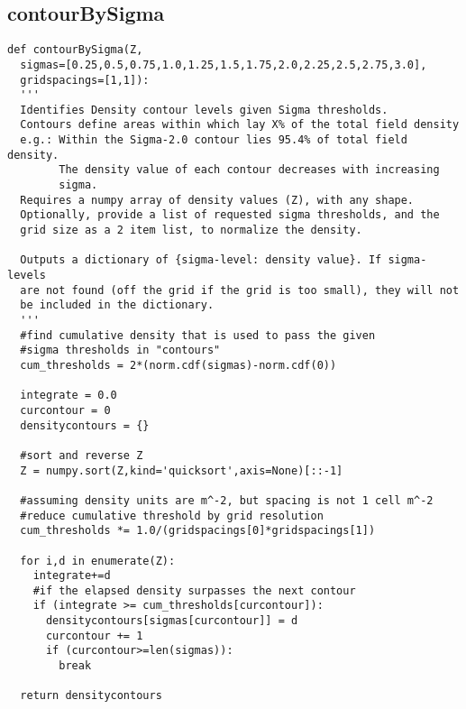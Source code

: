 \subsection{contourBySigma}
\begin{verbatim}
def contourBySigma(Z, 
  sigmas=[0.25,0.5,0.75,1.0,1.25,1.5,1.75,2.0,2.25,2.5,2.75,3.0],
  gridspacings=[1,1]):
  '''
  Identifies Density contour levels given Sigma thresholds.
  Contours define areas within which lay X% of the total field density
  e.g.: Within the Sigma-2.0 contour lies 95.4% of total field density.
        The density value of each contour decreases with increasing
        sigma.
  Requires a numpy array of density values (Z), with any shape.
  Optionally, provide a list of requested sigma thresholds, and the
  grid size as a 2 item list, to normalize the density.
  
  Outputs a dictionary of {sigma-level: density value}. If sigma-levels
  are not found (off the grid if the grid is too small), they will not
  be included in the dictionary.
  '''
  #find cumulative density that is used to pass the given
  #sigma thresholds in "contours"
  cum_thresholds = 2*(norm.cdf(sigmas)-norm.cdf(0))
  
  integrate = 0.0
  curcontour = 0
  densitycontours = {}
  
  #sort and reverse Z
  Z = numpy.sort(Z,kind='quicksort',axis=None)[::-1]
  
  #assuming density units are m^-2, but spacing is not 1 cell m^-2
  #reduce cumulative threshold by grid resolution
  cum_thresholds *= 1.0/(gridspacings[0]*gridspacings[1])
  
  for i,d in enumerate(Z):
    integrate+=d
    #if the elapsed density surpasses the next contour
    if (integrate >= cum_thresholds[curcontour]):
      densitycontours[sigmas[curcontour]] = d
      curcontour += 1
      if (curcontour>=len(sigmas)):
        break
  
  return densitycontours
\end{verbatim}

